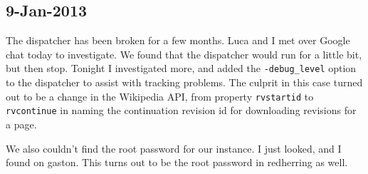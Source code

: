 \subsection{9-Jan-2013}

The dispatcher has been broken for a few months.
Luca and I met over Google chat today to investigate.
We found that the dispatcher would run for a little bit, but then stop.
Tonight I investigated more, and added the \texttt{-debug\_level} option
to the dispatcher to assist with tracking problems.
The culprit in this case turned out to be a change in the Wikipedia API,
from property \texttt{rvstartid} to \texttt{rvcontinue} in naming the
continuation revision id for downloading revisions for a page.

We also couldn't find the root password for our \mysql instance.
I just looked, and I found  on gaston.
This turns out to be the root password in redherring as well.


